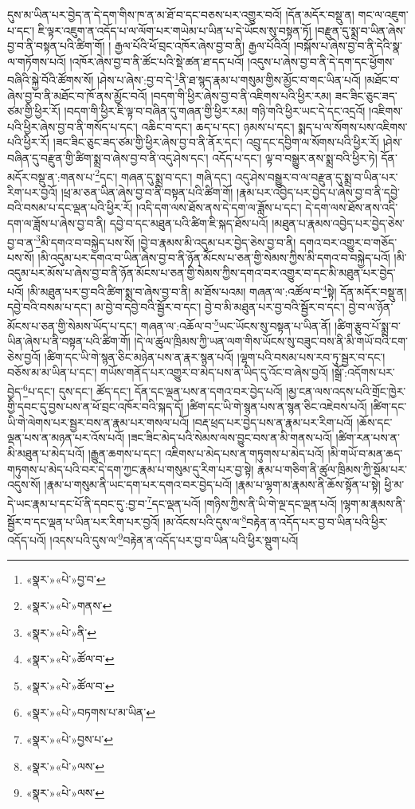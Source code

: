 དུས་མ་ཡིན་པར་བྱེད་ན་དེ་དག་གིས་ཁ་ན་མ་ཐོ་བ་དང་བཅས་པར་འགྱུར་བའོ། །དོན་མདོར་བསྡུ་ན། གང་ལ་འཇུག་པ་དང་། ཇི་ལྟར་འཇུག་ན་འདོད་པ་ལ་ལོག་པར་གཡེམ་པ་ཡིན་པ་དེ་ཡོངས་སུ་བསྟན་ཏོ། །བརྫུན་དུ་སྨྲ་བ་ཡིན་ཞེས་བྱ་བ་ནི་བསྟན་པའི་ཚིག་གོ། །
རྒྱལ་པོའི་ཕོ་བྲང་འཁོར་ཞེས་བྱ་བ་ནི། རྒྱལ་པོའིའོ། །བསྐོས་པ་ཞེས་བྱ་བ་ནི་དེའི་སྣ་ལ་གཏོགས་པའོ། །འཁོར་ཞེས་བྱ་བ་ནི་ཚོང་པའི་སྡེ་ཚན་ཐ་དད་པའོ། །འདུས་པ་ཞེས་བྱ་བ་ནི་དེ་དག་དང་ཕྱོགས་བཞིའི་སྐྱེ་བོའི་ཚོགས་སོ། །ཤེས་པ་ཞེས་:བྱ་བ་དེ་\footnote{«སྣར་»«པེ་»བྱ་བ་}ནི་ཐ་སྙད་རྣམ་པ་གསུམ་གྱིས་མྱོང་བ་གང་ཡིན་པའོ། །མཐོང་བ་ཞེས་བྱ་བ་ནི་མཐོང་བ་ཁོ་ནས་མྱོང་བའོ། །བདག་གི་ཕྱིར་ཞེས་བྱ་བ་ནི་འཇིགས་པའི་ཕྱིར་རམ། ཟང་ཟིང་ཅུང་ཟད་ཙམ་གྱི་ཕྱིར་རོ། །བདག་གི་ཕྱིར་ཇི་ལྟ་བ་བཞིན་དུ་གཞན་གྱི་ཕྱིར་རམ། གཉི་གའི་ཕྱིར་ཡང་དེ་དང་འདྲའོ། །འཇིགས་པའི་ཕྱིར་ཞེས་བྱ་བ་ནི་གསོད་པ་དང་། འཆིང་བ་དང་། ཆད་པ་དང་། ཉམས་པ་དང་། སྨད་པ་ལ་སོགས་པས་འཇིགས་པའི་ཕྱིར་རོ། །ཟང་ཟིང་ཅུང་ཟད་ཙམ་གྱི་ཕྱིར་ཞེས་བྱ་བ་ནི་ནོར་དང་། འབྲུ་དང་དབྱིག་ལ་སོགས་པའི་ཕྱིར་རོ། །ཤེས་བཞིན་དུ་བརྫུན་གྱི་ཚིག་སྨྲ་བ་ཞེས་བྱ་བ་ནི་འདུ་ཤེས་དང་། འདོད་པ་དང་། ལྟ་བ་བསྒྱུར་ནས་སྨྲ་བའི་ཕྱིར་ཏེ། དོན་མདོར་བསྡུ་ན་:གནས་པ་\footnote{«སྣར་»«པེ་»གནས་}དང་། གཞན་དུ་སྨྲ་བ་དང་། གཞི་དང་། འདུ་ཤེས་བསྒྱུར་བ་ལ་བརྫུན་དུ་སྨྲ་བ་ཡིན་པར་རིག་པར་བྱའོ། །ཕྲ་མ་ཅན་ཡིན་ཞེས་བྱ་བ་ནི་བསྟན་པའི་ཚིག་གོ། །རྣམ་པར་འབྱེད་པར་བྱེད་པ་ཞེས་བྱ་བ་ནི་དབྱེ་བའི་བསམ་པ་དང་ལྡན་པའི་ཕྱིར་རོ། །འདི་དག་ལས་ཐོས་ནས་དེ་དག་ལ་ཟློས་པ་དང་། དེ་དག་ལས་ཐོས་ནས་འདི་དག་ལ་ཟློས་པ་ཞེས་བྱ་བ་ནི། དབྱེ་བ་དང་མཐུན་པའི་ཚིག་ཇི་སྐད་ཐོས་པའོ། །མཐུན་པ་རྣམས་འབྱེད་པར་བྱེད་ཅེས་བྱ་བ་ན་\footnote{«སྣར་»«པེ་»ནི་}མི་དགའ་བ་བསྐྱེད་པས་སོ། །བྱེ་བ་རྣམས་མི་འདུམ་པར་བྱེད་ཅེས་བྱ་བ་ནི། དགའ་བར་འགྱུར་བ་གཅོད་པས་སོ། །མི་འདུམ་པར་དགའ་བ་ཡིན་ཞེས་བྱ་བ་ནི་ཉོན་མོངས་པ་ཅན་གྱི་སེམས་ཀྱིས་མི་དགའ་བ་བསྐྱེད་པའོ། །མི་འདུམ་པར་མོས་པ་ཞེས་བྱ་བ་ནི་ཉོན་མོངས་པ་ཅན་གྱི་སེམས་ཀྱིས་དགའ་བར་འགྱུར་བ་དང་མི་མཐུན་པར་བྱེད་པའོ། །མི་མཐུན་པར་བྱ་བའི་ཚིག་སྨྲ་བ་ཞེས་བྱ་བ་ནི། མ་ཐོས་པའམ། གཞན་ལ་:འཚོལ་བ་\footnote{«སྣར་»«པེ་»ཚོལ་བ་}སྟེ། དོན་མདོར་བསྡུ་ན། དབྱེ་བའི་བསམ་པ་དང་། མ་བྱེ་བ་དབྱེ་བའི་སྦྱོར་བ་དང་། བྱེ་བ་མི་མཐུན་པར་བྱ་བའི་སྦྱོར་བ་དང་། བྱེ་བ་ལ་ཉོན་མོངས་པ་ཅན་གྱི་སེམས་ཡོད་པ་དང་། གཞན་ལ་:འཆོལ་བ་\footnote{«སྣར་»«པེ་»ཚོལ་བ་}ཡང་ཡོངས་སུ་བསྟན་པ་ཡིན་ནོ། །ཚིག་རྩུབ་པོ་སྨྲ་བ་ཡིན་ཞེས་པ་ནི་བསྟན་པའི་ཚིག་གོ། །དེ་ལ་ཚུལ་ཁྲིམས་ཀྱི་ཡན་ལག་གིས་ཡོངས་སུ་བཟུང་བས་ནི་མི་གཡོ་བའི་ངག་ཅེས་བྱའོ། །ཚིག་དང་ཡི་གེ་སྙན་ཅིང་མཉེན་པས་ན་རྣར་སྙན་པའོ། །ལྷག་པའི་བསམ་པས་རབ་ཏུ་སྦྱར་བ་དང་། བཅོས་མ་མ་ཡིན་པ་དང་། གཡོས་གནོད་པར་འགྱུར་བ་མེད་པས་ན་ཡིད་དུ་འོང་བ་ཞེས་བྱའོ། །སྒྲོ་:འདོགས་པར་བྱེད་\footnote{«སྣར་»«པེ་»བཏགས་པ་མ་ཡིན་}པ་དང་། དུས་དང་། ཚོད་དང་། དོན་དང་ལྡན་པས་ན་དགའ་བར་བྱེད་པའོ། །མྱ་ངན་ལས་འདས་པའི་གྲོང་ཁྱེར་གྱི་དབང་དུ་བྱས་པས་ན་ཕོ་བྲང་འཁོར་བའི་སྐད་དོ། །ཚིག་དང་ཡི་གེ་སྙན་པས་ན་སྙན་ཅིང་འཇེབས་པའོ། །ཚིག་དང་ཡི་གེ་ལེགས་པར་སྦྱར་བས་ན་རྣམ་པར་གསལ་པའོ། །བརྡ་ཕྲད་པར་བྱེད་པས་ན་རྣམ་པར་རིག་པའོ། །ཆོས་དང་ལྡན་པས་ན་མཉན་པར་འོས་པའོ། །ཟང་ཟིང་མེད་པའི་སེམས་ལས་བྱུང་བས་ན་མི་གནས་པའོ། །ཚིག་རན་པས་ན་མི་མཐུན་པ་མེད་པའོ། །རྒྱུན་ཆགས་པ་དང་། འཇིགས་པ་མེད་པས་ན་གཏུགས་པ་མེད་པའོ། །མི་གཡོ་བ་མན་ཆད་གཏུགས་པ་མེད་པའི་བར་དེ་དག་ཀྱང་རྣམ་པ་གསུམ་དུ་རིག་པར་བྱ་སྟེ། རྣམ་པ་གཅིག་ནི་ཚུལ་ཁྲིམས་ཀྱི་སྡོམ་པར་འདུས་སོ། །རྣམ་པ་གསུམ་ནི་ཡང་དག་པར་དགའ་བར་བྱེད་པའོ། །རྣམ་པ་ལྷག་མ་རྣམས་ནི་ཆོས་སྟོན་པ་སྟེ། ཕྱི་མ་དེ་ཡང་རྣམ་པ་དང་པོ་ནི་དབང་དུ་:བྱ་བ་\footnote{«སྣར་»«པེ་»བྱས་པ་}དང་ལྡན་པའོ། །གཉིས་ཀྱིས་ནི་ཡི་གེ་ལྔ་དང་ལྡན་པའོ། །ལྷག་མ་རྣམས་ནི་སྦྱོར་བ་དང་ལྡན་པ་ཡིན་པར་རིག་པར་བྱའོ། །མ་འོངས་པའི་དུས་ལ་\footnote{«སྣར་»«པེ་»ལས་}བརྟེན་ན་འདོད་པར་བྱ་བ་ཡིན་པའི་ཕྱིར་འདོད་པའོ། །འདས་པའི་དུས་ལ་\footnote{«སྣར་»«པེ་»ལས་}བརྟེན་ན་འདོད་པར་བྱ་བ་ཡིན་པའི་ཕྱིར་སྡུག་པའོ། 
